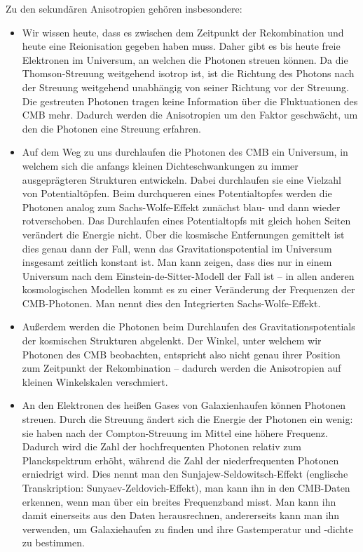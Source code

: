 \documentclass[10pt,a4paper]{article}
\begin{document}
Zu den sekundären Anisotropien gehören insbesondere:
\begin{itemize}
\item Wir wissen heute, dass es zwischen dem Zeitpunkt der Rekombination und heute eine Re\-ionisation gegeben haben muss. Daher gibt es bis heute freie Elektronen im Universum, an welchen die Photonen streuen können. Da die Thomson-Streuung weitgehend isotrop ist, ist die Richtung des Photons nach der Streuung weitgehend unabhängig von seiner Richtung vor der Streuung. Die gestreuten Photonen tragen keine Information über die Fluktuationen des CMB mehr. Dadurch werden die Anisotropien um den Faktor geschwächt, um den die Photonen eine Streuung erfahren.\cite{Schneider}
\item Auf dem Weg zu uns durchlaufen die Photonen des CMB ein Universum, in welchem sich die anfangs kleinen Dichteschwankungen zu immer ausgeprägteren Strukturen entwickeln. Dabei durchlaufen sie eine Vielzahl von Potentialtöpfen. Beim durchqueren eines Potentialtopfes werden die Photonen analog zum Sachs-Wolfe-Effekt zunächst blau- und dann wieder rotverschoben. Das Durchlaufen eines Potentialtopfs mit gleich hohen Seiten verändert die Energie nicht. Über die kosmische Entfernungen gemittelt ist dies genau dann der Fall, wenn das Gravitationspotential im Universum insgesamt zeitlich konstant ist. Man kann zeigen, dass dies nur in einem Universum nach dem Einstein-de-Sitter-Modell der Fall ist -- in allen anderen kosmologischen Modellen kommt es zu einer Veränderung der Frequenzen der CMB-Photonen. Man nennt dies den Integrierten Sachs-Wolfe-Effekt.\cite{Schneider}
\item Außerdem werden die Photonen beim Durchlaufen des Gravitationspotentials der kosmischen Strukturen abgelenkt. Der Winkel, unter welchem wir Photonen des CMB beobachten, entspricht also nicht genau ihrer Position zum Zeitpunkt der Rekombination -- dadurch werden die Anisotropien auf kleinen Winkelskalen verschmiert.\cite{Schneider}
\item An den Elektronen des heißen Gases von Galaxienhaufen können Photonen streuen. %
Durch die Streuung ändert sich die Energie der Photonen ein wenig: sie haben nach der Compton-Streuung im Mittel eine höhere Frequenz. Dadurch wird die Zahl der hochfrequenten Photonen relativ zum Planckspektrum erhöht, während die Zahl der niederfrequenten Photonen erniedrigt wird. Dies nennt man den Sunjajew-Seldowitsch-Effekt (englische Transkription: Sunyaev-Zeldovich-Effekt), man kann ihn in den CMB-Daten erkennen, wenn man über ein breites Frequenzband misst. Man kann ihn damit einerseits aus den Daten herausrechnen, andererseits kann man ihn verwenden, um Galaxiehaufen zu finden und ihre Gastemperatur und -dichte zu bestimmen.\cite{Schneider}
\end{itemize}
\end{document}
